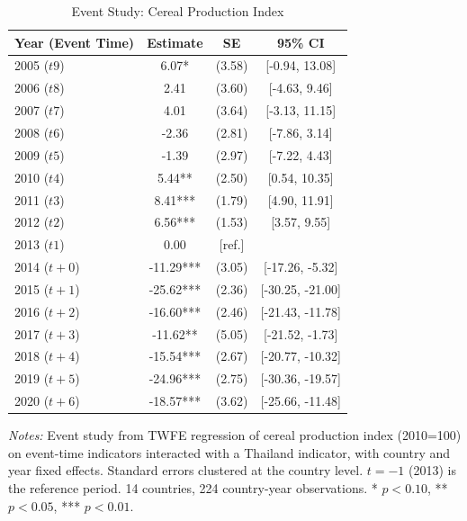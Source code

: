 \begin{table}[htbp]
\centering
\begin{threeparttable}
\caption{Event Study: Cereal Production Index}
\label{tab:eventstudy}
\begin{tabular}{lccc}
\toprule
  Year (Event Time) & Estimate & SE & 95\% CI \\
\midrule
  2005 ($t9$) & 6.07* & (3.58) & [-0.94, 13.08] \\
  2006 ($t8$) & 2.41 & (3.60) & [-4.63, 9.46] \\
  2007 ($t7$) & 4.01 & (3.64) & [-3.13, 11.15] \\
  2008 ($t6$) & -2.36 & (2.81) & [-7.86, 3.14] \\
  2009 ($t5$) & -1.39 & (2.97) & [-7.22, 4.43] \\
  2010 ($t4$) & 5.44** & (2.50) & [0.54, 10.35] \\
  2011 ($t3$) & 8.41*** & (1.79) & [4.90, 11.91] \\
  2012 ($t2$) & 6.56*** & (1.53) & [3.57, 9.55] \\
  2013 ($t1$) & 0.00 & [ref.] &  \\
  2014 ($t+0$) & -11.29*** & (3.05) & [-17.26, -5.32] \\
  2015 ($t+1$) & -25.62*** & (2.36) & [-30.25, -21.00] \\
  2016 ($t+2$) & -16.60*** & (2.46) & [-21.43, -11.78] \\
  2017 ($t+3$) & -11.62** & (5.05) & [-21.52, -1.73] \\
  2018 ($t+4$) & -15.54*** & (2.67) & [-20.77, -10.32] \\
  2019 ($t+5$) & -24.96*** & (2.75) & [-30.36, -19.57] \\
  2020 ($t+6$) & -18.57*** & (3.62) & [-25.66, -11.48] \\
\bottomrule
\end{tabular}
\begin{tablenotes}[flushleft]\footnotesize
\item \textit{Notes:} Event study from TWFE regression of cereal production index (2010=100) on event-time indicators interacted with a Thailand indicator, with country and year fixed effects. Standard errors clustered at the country level. $t=-1$ (2013) is the reference period. 14 countries, 224 country-year observations. * $p<0.10$, ** $p<0.05$, *** $p<0.01$.
\end{tablenotes}
\end{threeparttable}
\end{table}
